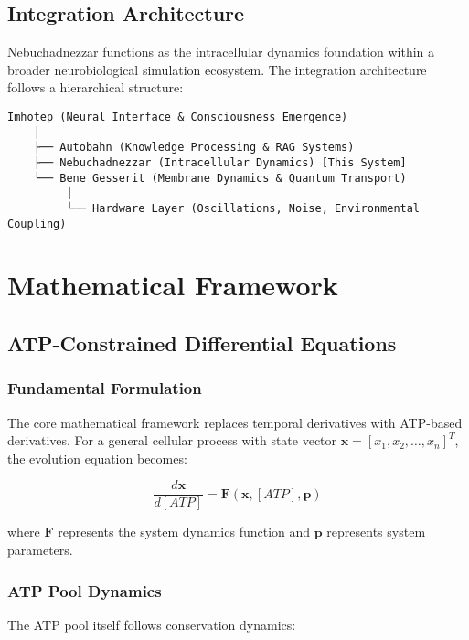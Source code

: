 \documentclass[12pt,a4paper]{article}
\begin{document}
\subsection{Integration Architecture}

Nebuchadnezzar functions as the intracellular dynamics foundation within a broader neurobiological simulation ecosystem. The integration architecture follows a hierarchical structure:

\begin{verbatim}
Imhotep (Neural Interface & Consciousness Emergence)
    │
    ├── Autobahn (Knowledge Processing & RAG Systems)
    ├── Nebuchadnezzar (Intracellular Dynamics) [This System]
    └── Bene Gesserit (Membrane Dynamics & Quantum Transport)
         │
         └── Hardware Layer (Oscillations, Noise, Environmental Coupling)
\end{verbatim}

\section{Mathematical Framework}

\subsection{ATP-Constrained Differential Equations}

\subsubsection{Fundamental Formulation}

The core mathematical framework replaces temporal derivatives with ATP-based derivatives. For a general cellular process with state vector $\mathbf{x} = [x_1, x_2, \ldots, x_n]^T$, the evolution equation becomes:

\begin{equation}
\frac{d\mathbf{x}}{d[ATP]} = \mathbf{F}(\mathbf{x}, [ATP], \mathbf{p})
\end{equation}

where $\mathbf{F}$ represents the system dynamics function and $\mathbf{p}$ represents system parameters.

\subsubsection{ATP Pool Dynamics}

The ATP pool itself follows conservation dynamics:
\end{document}
